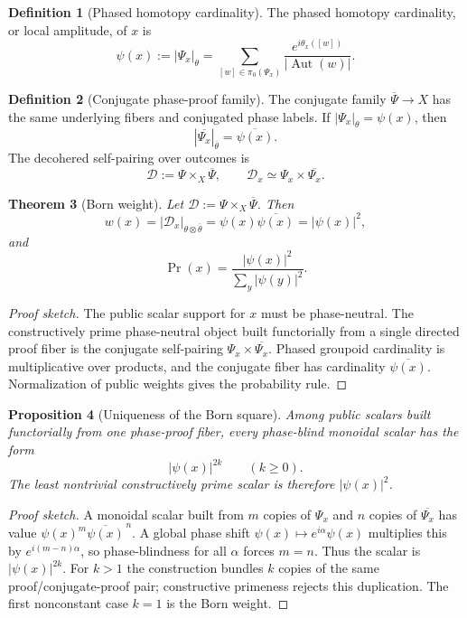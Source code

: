 \documentclass[11pt]{article}
\theoremstyle{plain}
\newtheorem{theorem}{Theorem}[section]
\newtheorem{proposition}[theorem]{Proposition}
\theoremstyle{definition}
\newtheorem{definition}[theorem]{Definition}
\theoremstyle{remark}
\newenvironment{proofsketch}{\begin{proof}[Proof sketch]}{\end{proof}}
\newcommand{\Aut}{\operatorname{Aut}}
\begin{document}
\begin{definition}[Phased homotopy cardinality]
The phased homotopy cardinality, or local amplitude, of \(x\) is
\[
\psi(x):=|\Psi_x|_\theta
=
\sum_{[w]\in\pi_0(\Psi_x)}
\frac{e^{i\theta_x([w])}}{|\Aut(w)|}.
\]
\end{definition}

\begin{definition}[Conjugate phase-proof family]
The conjugate family \(\overline{\Psi}\to X\) has the same underlying fibers and conjugated phase labels. If \(|\Psi_x|_\theta=\psi(x)\), then
\[
|\overline{\Psi_x}|_{\overline{\theta}}
=
\overline{\psi(x)}.
\]
The decohered self-pairing over outcomes is
\[
\mathcal{D}:=\Psi\times_X\overline{\Psi},
\qquad
\mathcal{D}_x\simeq\Psi_x\times\overline{\Psi_x}.
\]
\end{definition}

\begin{theorem}[Born weight]
Let \(\mathcal{D}:=\Psi\times_X\overline{\Psi}\). Then
\[
w(x)=|\mathcal{D}_x|_{\theta\otimes\overline{\theta}}
=\psi(x)\overline{\psi(x)}
=|\psi(x)|^2,
\]
and
\[
\Pr(x)=\frac{|\psi(x)|^2}{\sum_y|\psi(y)|^2}.
\]
\end{theorem}

\begin{proofsketch}
The public scalar support for \(x\) must be phase-neutral. The constructively prime phase-neutral object built functorially from a single directed proof fiber is the conjugate self-pairing \(\Psi_x\times\overline{\Psi_x}\). Phased groupoid cardinality is multiplicative over products, and the conjugate fiber has cardinality \(\overline{\psi(x)}\). Normalization of public weights gives the probability rule.
\end{proofsketch}

\begin{proposition}[Uniqueness of the Born square]
Among public scalars built functorially from one phase-proof fiber, every phase-blind monoidal scalar has the form
\[
|\psi(x)|^{2k}\qquad(k\ge0).
\]
The least nontrivial constructively prime scalar is therefore \(|\psi(x)|^2\).
\end{proposition}

\begin{proofsketch}
A monoidal scalar built from \(m\) copies of \(\Psi_x\) and \(n\) copies of \(\overline{\Psi_x}\) has value \(\psi(x)^m\overline{\psi(x)}^{\,n}\). A global phase shift \(\psi(x)\mapsto e^{i\alpha}\psi(x)\) multiplies this by \(e^{i(m-n)\alpha}\), so phase-blindness for all \(\alpha\) forces \(m=n\). Thus the scalar is \(|\psi(x)|^{2k}\). For \(k>1\) the construction bundles \(k\) copies of the same proof/conjugate-proof pair; constructive primeness rejects this duplication. The first nonconstant case \(k=1\) is the Born weight.
\end{proofsketch}
\end{document}
